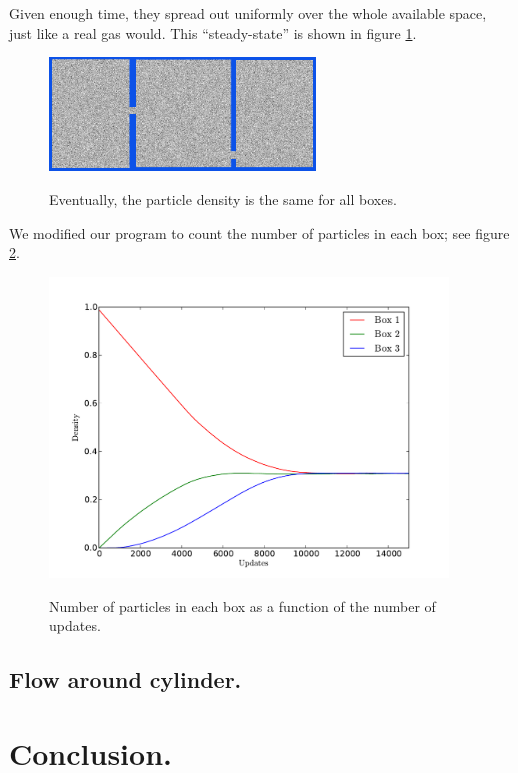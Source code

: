 \documentclass[12pt,a4paper]{article}
\begin{document}
Given enough time, they spread out uniformly over the whole available space, just like a real gas would.
This ``steady-state'' is shown in figure \ref{diffusionend}.
\begin{figure}[htp]
\caption{Eventually, the particle density is the same for all boxes.}
\centering
  \includegraphics[width=200pt]{figs/diffusionend.png}
\label{diffusionend}
\end{figure}

We modified our program to count the number of particles in each box; see figure \ref{gascount}.
\begin{figure}[htp]
\caption{Number of particles in each box as a function of the number of updates.}
\centering
  \includegraphics[width=300pt]{figs/gascount.pdf}
\label{gascount}
\end{figure}

\subsection{Flow around cylinder.}

\section{Conclusion.}
\end{document}
